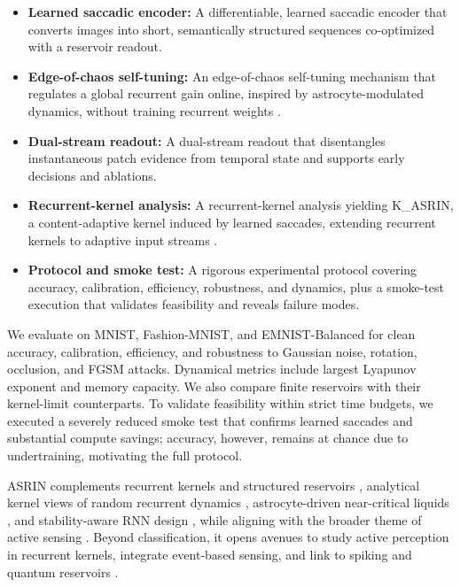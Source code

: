 \documentclass{article}
\begin{document}
\begin{itemize}
  \item \textbf{Learned saccadic encoder:} A differentiable, learned saccadic encoder that converts images into short, semantically structured sequences co-optimized with a reservoir readout.
  \item \textbf{Edge-of-chaos self-tuning:} An edge-of-chaos self-tuning mechanism that regulates a global recurrent gain online, inspired by astrocyte-modulated dynamics, without training recurrent weights \cite{ivanov-2021-increasing}.
  \item \textbf{Dual-stream readout:} A dual-stream readout that disentangles instantaneous patch evidence from temporal state and supports early decisions and ablations.
  \item \textbf{Recurrent-kernel analysis:} A recurrent-kernel analysis yielding K\_ASRIN, a content-adaptive kernel induced by learned saccades, extending recurrent kernels to adaptive input streams \cite{dong-2020-reservoir,nestler-2020-unfolding}.
  \item \textbf{Protocol and smoke test:} A rigorous experimental protocol covering accuracy, calibration, efficiency, robustness, and dynamics, plus a smoke-test execution that validates feasibility and reveals failure modes.
\end{itemize}

We evaluate on MNIST, Fashion-MNIST, and EMNIST-Balanced for clean accuracy, calibration, efficiency, and robustness to Gaussian noise, rotation, occlusion, and FGSM attacks. Dynamical metrics include largest Lyapunov exponent and memory capacity. We also compare finite reservoirs with their kernel-limit counterparts. To validate feasibility within strict time budgets, we executed a severely reduced smoke test that confirms learned saccades and substantial compute savings; accuracy, however, remains at chance due to undertraining, motivating the full protocol.

ASRIN complements recurrent kernels and structured reservoirs \cite{dong-2020-reservoir}, analytical kernel views of random recurrent dynamics \cite{nestler-2020-unfolding}, astrocyte-driven near-critical liquids \cite{ivanov-2021-increasing}, and stability-aware RNN design \cite{eisenmann-2023-bifurcations,rusch-2021-unicornn,orhan-2019-improved}, while aligning with the broader theme of active sensing \cite{so-2023-pixelrnn}. Beyond classification, it opens avenues to study active perception in recurrent kernels, integrate event-based sensing, and link to spiking and quantum reservoirs \cite{bausch-2020-recurrent}.
\end{document}
